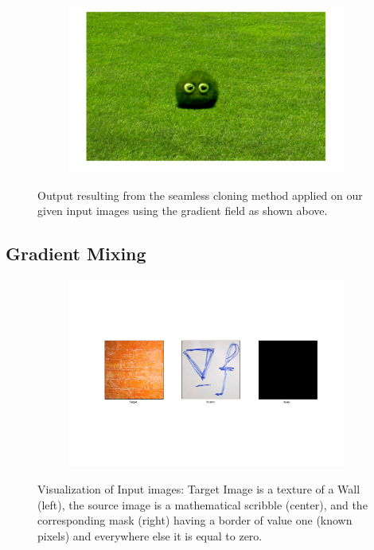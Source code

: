 \documentclass{paper}
\begin{document}
\begin{figure}[H]
    \centering
    \begin{subfigure}{1.0\textwidth}
        \includegraphics[width=\textwidth]{../../outputs/p4/seamless_cloning/monster/output}
    \end{subfigure}
    \caption{Output resulting from the seamless cloning method applied on our given input images using the gradient field as shown above.}
    \label{fig:seamless_cloning_monster_out}       
\end{figure}


\subsection{Gradient Mixing}

\begin{figure}[H]
    \centering
    \begin{subfigure}{1.0\textwidth}
        \includegraphics[width=\textwidth]{../../outputs/p4/gradient_mixing/input}
    \end{subfigure}
    \caption{Visualization of Input images: Target Image is a texture of a Wall (left), the source image is a mathematical scribble (center), and the corresponding mask (right) having a border of value one (known pixels) and everywhere else it is equal to zero.}
    \label{fig:gradient_mixing_input}       
\end{figure}
\end{document}
